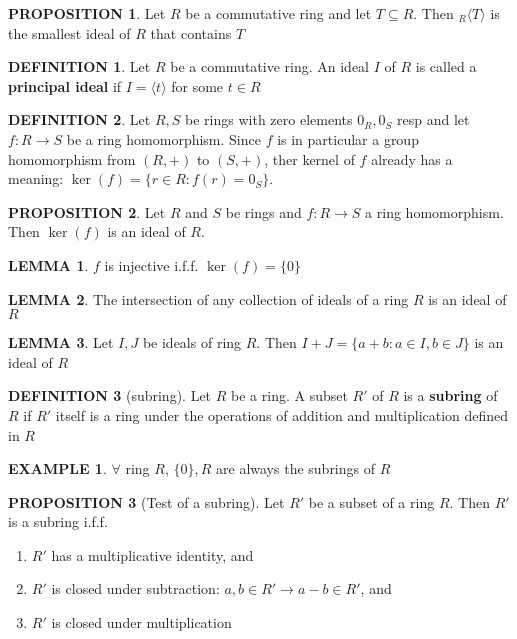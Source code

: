 \documentclass[12pt]{article}
\theoremstyle{definition}
\newtheorem{definition}{DEFINITION}[subsection]
\newtheorem{lemma}{LEMMA}[subsection]
\newtheorem{prop}{PROPOSITION}[subsection]
\newtheorem{example}{EXAMPLE}[subsection]
\begin{document}
\begin{prop}
    Let $R$ be a commutative ring and let $T \subseteq R$. Then $_R\langle T \rangle$ is the smallest ideal of $R$ that contains $T$
\end{prop}

\begin{definition}
    Let $R$ be a commutative ring. An ideal $I$ of $R$ is called a \textbf{principal ideal} if $I = \langle t \rangle$ for some $t \in R$
\end{definition}

\begin{definition}
    Let $R,S$ be rings with zero elements $0_R,0_S$ resp and let $f:R\rightarrow S$ be a ring homomorphism. Since $f$ is in particular a group homomorphism from $(R,+)$ to $(S,+)$, ther kernel of $f$ already has a meaning: $\ker(f) = \{r \in R: f(r) = 0_S\}$.
\end{definition}

\begin{prop}
    Let $R$ and $S$ be rings and $f:R \rightarrow S$ a ring homomorphism. Then $\ker(f)$ is an ideal of $R$.
\end{prop}

\begin{lemma}
    $f$ is injective i.f.f. $\ker(f) = \{0\}$
\end{lemma}

\begin{lemma}
    The intersection of any collection of ideals of a ring $R$ is an ideal of $R$
\end{lemma}

\begin{lemma}
    Let $I,J$ be ideals of ring $R$. Then $I+J = \{a+b:a\in I, b\in J\}$ is an ideal of $R$
\end{lemma}

\begin{definition}[subring]
    Let $R$ be a ring. A subset $R'$ of $R$ is a \textbf{subring} of $R$ if $R'$ itself is a ring under the operations of addition and multiplication defined in $R$
\end{definition}

\begin{example}
    $\forall$ ring $R$, $\{0\}, R$ are always the subrings of $R$
\end{example}

\begin{prop}[Test of a subring]
    Let $R'$ be a subset of a ring $R$. Then $R'$ is a subring i.f.f.
    \begin{enumerate}
        \item $R'$ has a multiplicative identity, and
        \item $R'$ is closed under subtraction: $a,b\in R' \rightarrow a-b\in R'$, and
        \item $R'$ is closed under multiplication
    \end{enumerate}
\end{prop}
\end{document}
